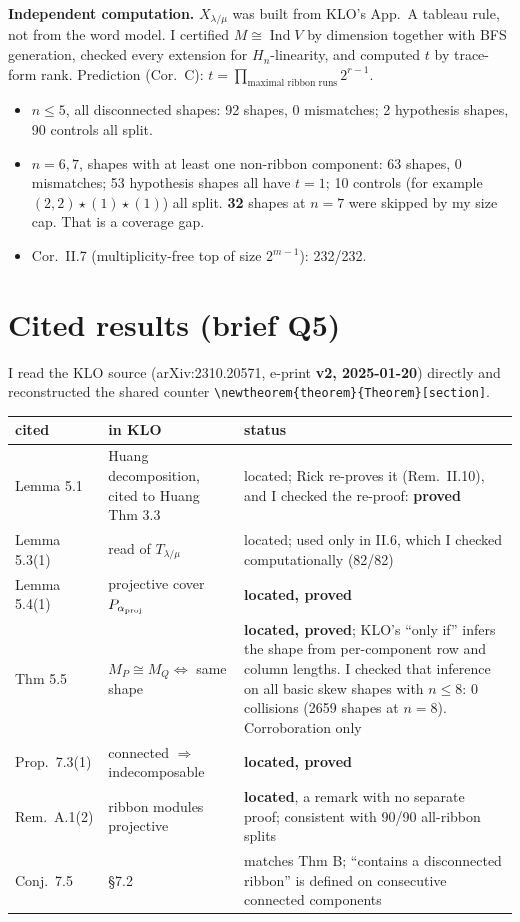 \documentclass[11pt]{article}
\newcommand{\Ind}{\operatorname{Ind}}
\begin{document}
\textbf{Independent computation.} $X_{\lambda/\mu}$ was built from KLO's App.~A tableau rule, not
from the word model. I certified $M\cong\Ind V$ by dimension together with BFS generation, checked
every extension for $H_n$-linearity, and computed $t$ by trace-form rank. Prediction (Cor.~C):
$t=\prod_{\text{maximal ribbon runs}}2^{r-1}$.
\begin{itemize}[nosep]
\item $n\le5$, all disconnected shapes: 92 shapes, 0 mismatches; 2 hypothesis shapes, 90 controls
all split.
\item $n=6,7$, shapes with at least one non-ribbon component: 63 shapes, 0 mismatches; 53
hypothesis shapes all have $t=1$; 10 controls (for example $(2,2)\star(1)\star(1)$) all split.
\textbf{32} shapes at $n=7$ were skipped by my size cap. That is a coverage gap.
\item Cor.~II.7 (multiplicity-free top of size $2^{m-1}$): 232/232.
\end{itemize}

\section{Cited results (brief Q5)}
I read the KLO source (arXiv:2310.20571, e-print \textbf{v2, 2025-01-20}) directly and
reconstructed the shared counter \verb|\newtheorem{theorem}{Theorem}[section]|.
\begin{center}\small
\begin{tabular}{@{}p{2.6cm}p{6.6cm}p{6.6cm}@{}}\toprule
cited & in KLO & status\\\midrule
Lemma 5.1 & Huang decomposition, cited to Huang Thm 3.3 & located; Rick re-proves it (Rem.~II.10), and I checked the re-proof: \textbf{proved}\\
Lemma 5.3(1) & read of $T_{\lambda/\mu}$ & located; used only in II.6, which I checked computationally (82/82)\\
Lemma 5.4(1) & projective cover $P_{\alpha_{\rm proj}}$ & \textbf{located, proved}\\
Thm 5.5 & $M_P\cong M_Q\iff$ same shape & \textbf{located, proved}; KLO's ``only if'' infers the shape from per-component row and column lengths. I checked that inference on all basic skew shapes with $n\le8$: 0 collisions (2659 shapes at $n=8$). Corroboration only\\
Prop.~7.3(1) & connected $\Rightarrow$ indecomposable & \textbf{located, proved}\\
Rem.~A.1(2) & ribbon modules projective & \textbf{located}, a remark with no separate proof; consistent with 90/90 all-ribbon splits\\
Conj.~7.5 & \S7.2 & matches Thm B; ``contains a disconnected ribbon'' is defined on consecutive connected components\\
\bottomrule\end{tabular}
\end{center}
\end{document}
